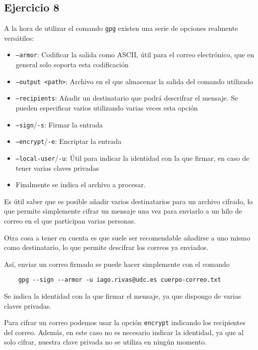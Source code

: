 \subsection{Ejercicio 8}
\graphicspath{ {img/08} }

A la hora de utilizar el comando \texttt{gpg} existen una serie de opciones realmente versátiles:

\begin{itemize}
    \item{\texttt{--armor}: Codificar la salida como ASCII, útil para el correo electrónico, que en general solo soporta esta codificación}
    \item{\texttt{--output <path>}: Archivo en el que almacenar la salida del comando utilizado}
    \item{\texttt{--recipients}: Añadir un destinatario que podrá descrifrar el mensaje. Se pueden especificar varios utilizando varias veces esta opción}
    \item{\texttt{--sign}/\texttt{-s}: Firmar la entrada}
    \item{\texttt{--encrypt}/\texttt{-e}: Encriptar la entrada}
    \item{\texttt{--local-user}/\texttt{-u}: Útil para indicar la identidad con la que firmar, en caso de tener varias claves privadas}
    \item{Finalmente se indica el archivo a procesar.}
\end{itemize}

Es útil saber que es posible añadir varios destinatarios para un archivo cifrado, lo que permite simplemente cifrar un mensaje una vez para enviarlo a un hilo de correo en el que participan varias personas.

Otra cosa a tener en cuenta es que suele ser recomendable añadirse a uno mismo como destinatario, lo que permite descifrar los correos ya enviados.

Así, enviar un correo firmado se puede hacer simplemente con el comando

\begin{verbatim}
    gpg --sign --armor -u iago.rivas@udc.es cuerpo-correo.txt
\end{verbatim}

Se indica la identidad con la que firmar el mensaje, ya que dispongo de varias claves privadas.

Para cifrar un correo podemos usar la opción \texttt{encrypt} indicando los recipientes del correo. Además, en este caso no es necesario indicar la identidad, ya que al solo cifrar, nuestra clave privada no se utiliza en ningún momento.

